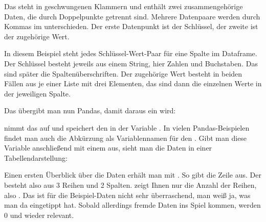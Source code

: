

\PYTHON{\}}

\medskip

Das  steht in geschwungenen Klammern und enthält zwei zusammengehörige Daten, die durch Doppelpunkte getrennt sind. Mehrere Datenpaare werden durch Kommas im  unterschieden. Der erste Datenpunkt ist der Schlüssel, der zweite ist der zugehörige Wert.

In diesem Beispiel steht jedes Schlüssel-Wert-Paar für eine Spalte im Dataframe. Der Schlüssel besteht jeweils aus einem String, hier Zahlen und Buchstaben. Das sind später die Spaltenüberschriften. Der zugehörige Wert besteht in beiden Fällen aus je einer Liste mit drei Elementen, das sind dann die einzelnen Werte in der jeweiligen Spalte.

Das  übergibt man nun Pandas, damit daraus ein  wird:

\medskip


\medskip

 nimmt das  auf und speichert den  in der Variable . In vielen Pandas-Beispielen findet man auch die Abkürzung als Variablennamen für den . Gibt man diese Variable anschließend mit einem  aus, sieht man die Daten in einer Tabellendarstellung:

\medskip





\medskip


Einen ersten Überblick über die Daten erhält man mit . So gibt  die Zeile  aus. Der  besteht also aus 3 Reihen und 2 Spalten.  zeigt Ihnen nur die Anzahl der Reihen, also . Das ist für die Beispiel-Daten nicht sehr überraschend, man weiß ja, was man da eingetippt hat. Sobald allerdings fremde Daten ins Spiel kommen, werden 0 und  wieder relevant.

